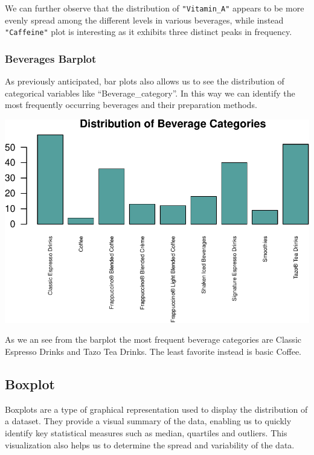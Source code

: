 \documentclass[
]{article}
\begin{document}
We can further observe that the distribution of \texttt{"Vitamin\_A"}
appears to be more evenly spread among the different levels in various
beverages, while instead \texttt{"Caffeine"} plot is interesting as it
exhibits three distinct peaks in frequency.

\subsubsection{Beverages Barplot}\label{beverages-barplot}

As previously anticipated, bar plots also allows us to see the
distribution of categorical variables like ``Beverage\_category''. In
this way we can identify the most frequently occurring beverages and
their preparation methods.

\begin{center}\includegraphics{Statistical_Learning_Final_Report_files/figure-latex/beverage_barplot-1} \end{center}

As we an see from the barplot the most frequent beverage categories are
Classic Espresso Drinks and Tazo Tea Drinks. The least favorite instead
is basic Coffee.

\subsection{Boxplot}\label{boxplot}

Boxplots are a type of graphical representation used to display the
distribution of a dataset. They provide a visual summary of the data,
enabling us to quickly identify key statistical measures such as median,
quartiles and outliers. This visualization also helps us to determine
the spread and variability of the data.
\end{document}
